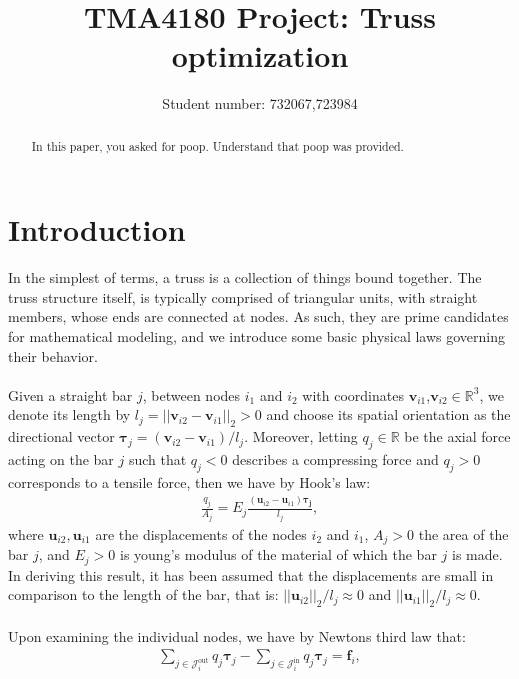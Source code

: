 \documentclass[10pt,a4paper]{article}
\begin{document}
\title{TMA4180 Project: Truss optimization}
\author{Student number: 732067,723984}
\maketitle
\begin{abstract}
\noindent
In this paper, you asked for poop. Understand that poop was provided.
\end{abstract}
\section{Introduction}
In the simplest of terms, a truss is a collection of things bound together. The truss structure itself, is typically comprised of triangular units, with straight members, whose ends are connected at nodes. As such, they are prime candidates for mathematical modeling, and we introduce some basic physical laws governing their behavior.
\\\\
Given a straight bar $j$, between nodes $i_1$ and $i_2$ with coordinates $\boldsymbol{v}_{i1}$,$\boldsymbol{v}_{i2}\in\mathbb{R}^3$, we denote its length by $l_j = ||\boldsymbol{v}_{i2} - \boldsymbol{v}_{i1}||_{2} > 0$ and choose its spatial orientation as the directional vector $\boldsymbol{\tau}_j = (\boldsymbol{v}_{i2}-\boldsymbol{v}_{i1})/l_j$. Moreover, letting $q_j\in\mathbb{R}$ be the axial force acting on the bar $j$ such that $q_j < 0$ describes a compressing force and $q_j > 0$ corresponds to a tensile force, then we have by Hook's law:
\begin{align}
\frac{q_j}{A_j} = E_j\frac{(\boldsymbol{u}_{i2}-\boldsymbol{u}_{i1})\boldsymbol{\tau_j}}{l_j} \label{eq: 1},
\end{align}
where $\boldsymbol{u}_{i2},\boldsymbol{u}_{i1}$ are the displacements of the nodes $i_2$ and $i_1$, $A_j>0$ the area of the bar $j$, and $E_j>0$ is young's modulus of the material of which the bar $j$ is made. In deriving this result, it has been assumed that the displacements are small in comparison to the length of the bar, that is: $||\boldsymbol{u}_{i2}||_2/l_j \approx 0$ and $||\boldsymbol{u}_{i1}||_2/l_j \approx 0$.
\\\\
Upon examining the individual nodes, we have by Newtons third law that:
\begin{align}
\sum_{j\in\mathcal{J}_i^{\text{out}}}q_j\boldsymbol{\tau}_j-\sum_{j\in\mathcal{J}_i^{\text{in}}}q_j\boldsymbol{\tau}_j = \boldsymbol{f}_i \label{eq: 2},
\end{align}
\end{document}
